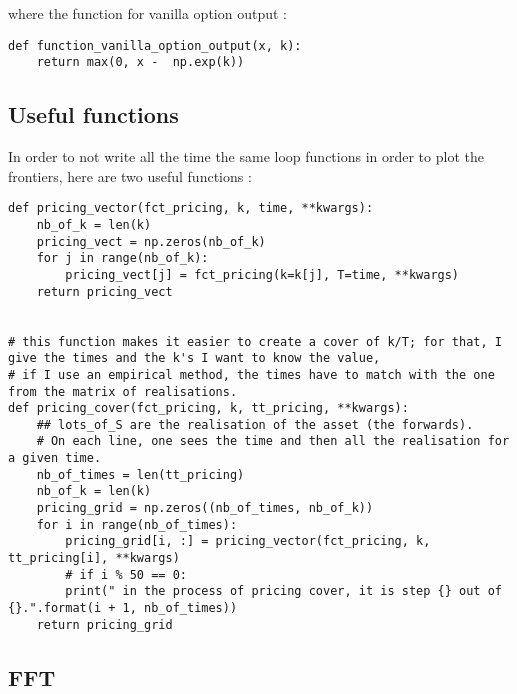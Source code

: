 where the function for vanilla option output :

\begin{Verbatim}[fontsize=\tiny]
def function_vanilla_option_output(x, k):
    return max(0, x -  np.exp(k))
\end{Verbatim}

\subsection{Useful functions}
In order to not write all the time the same loop functions in order to plot the frontiers, here are two useful functions : 

\begin{Verbatim}[fontsize=\tiny]
def pricing_vector(fct_pricing, k, time, **kwargs):
    nb_of_k = len(k)
    pricing_vect = np.zeros(nb_of_k)
    for j in range(nb_of_k):
        pricing_vect[j] = fct_pricing(k=k[j], T=time, **kwargs)
    return pricing_vect


# this function makes it easier to create a cover of k/T; for that, I give the times and the k's I want to know the value,
# if I use an empirical method, the times have to match with the one from the matrix of realisations.
def pricing_cover(fct_pricing, k, tt_pricing, **kwargs):
    ## lots_of_S are the realisation of the asset (the forwards).
    # On each line, one sees the time and then all the realisation for a given time.
    nb_of_times = len(tt_pricing)
    nb_of_k = len(k)
    pricing_grid = np.zeros((nb_of_times, nb_of_k))
    for i in range(nb_of_times):
        pricing_grid[i, :] = pricing_vector(fct_pricing, k, tt_pricing[i], **kwargs)
        # if i % 50 == 0:
        print(" in the process of pricing cover, it is step {} out of {}.".format(i + 1, nb_of_times))
    return pricing_grid
\end{Verbatim}


\subsection{FFT}


